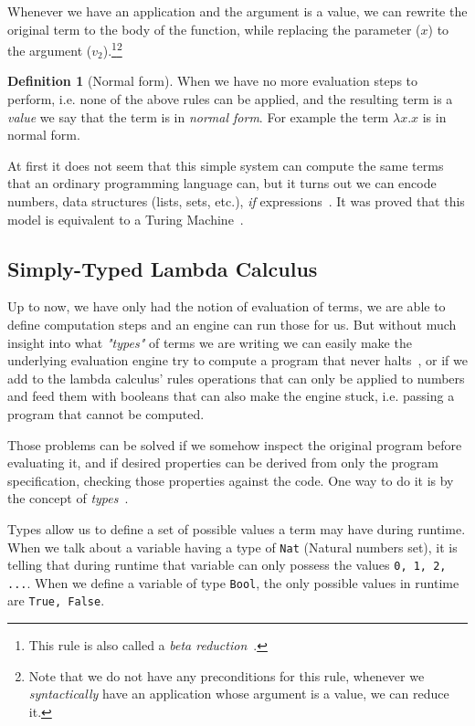 \documentclass[12pt]{article}
\theoremstyle{definition}
\newtheorem{definition}{Definition}[section]
\newcommand{\code}[1]{\texttt{#1}}
\begin{document}
Whenever we have an application and the argument is a value, we can rewrite the original term to the body of the function, while replacing the parameter ($x$) to the argument ($v_2$).\footnote{This rule is also called a \emph{beta reduction}~\cite{tapl}.}\footnote{Note that we do not have any preconditions for this rule, whenever we \emph{syntactically} have an application whose argument is a value, we can reduce it.}

\begin{definition}[Normal form]
       When we have no more evaluation steps to perform, i.e. none of the above rules can be applied, and the resulting term is a \emph{value} we say that the term is in \emph{normal form}. For example the term $\lambda x.x$ is in normal form.
\end{definition}

At first it does not seem that this simple system can compute the same terms that an ordinary programming language can, but it turns out we can encode numbers, data structures (lists, sets, etc.), \emph{if} expressions~\cite{tapl}.
It was proved that this model is equivalent to a Turing Machine~\cite{lambda-church}.

\subsection{Simply-Typed Lambda Calculus}

Up to now, we have only had the notion of evaluation of terms, we are able to define computation steps and an engine can run those for us.
But without much insight into what \emph{"types"} of terms we are writing we can easily make the underlying evaluation engine try to compute a program that never halts~\cite{tapl}, or if we add to the lambda calculus' rules operations that can only be applied to numbers and feed them with booleans that can also make the engine stuck, i.e. passing a program that cannot be computed.

Those problems can be solved if we somehow inspect the original program before evaluating it, and if desired properties can be derived from only the program specification, checking those properties against the code. One way to do it is by the concept of \emph{types}~\cite{tapl}.

Types allow us to define a set of possible values a term may have during runtime. When we talk about a variable having a type of \code{Nat} (Natural numbers set), it is telling that during runtime that variable can only possess the values \code{0, 1, 2, ...}. When we define a variable of type \code{Bool}, the only possible values in runtime are \code{True, False}.
\end{document}
